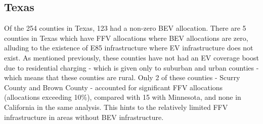 \documentclass[answers]{exam}
\begin{document}
\subsection{Texas}
Of the 254 counties in Texas, 123 had a non-zero BEV allocation. 
There are 5 counties in Texas which have FFV allocations where BEV allocations are zero, alluding to the existence of E85 infrastructure where EV infrastructure does not exist. As mentioned previously, these counties have not had an EV coverage boost due to residential charging - which is given only to suburban and urban counties - which means that these counties are rural. Only 2 of these counties - Scurry County and Brown County - accounted for significant FFV allocations (allocations exceeding 10\%), compared with 15 with Minnesota, and none in California in the same analysis. This hints to the relatively limited FFV infrastructure in areas without BEV infrastructure.
\end{document}
